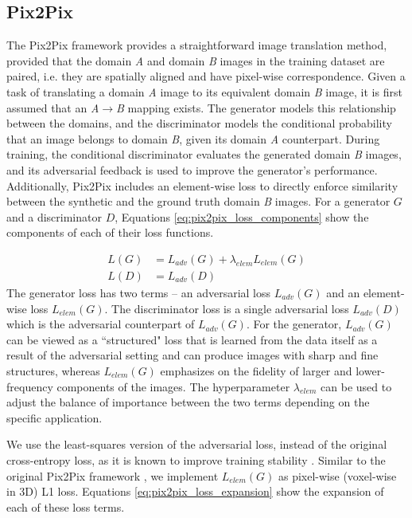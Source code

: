 \subsection{Pix2Pix}
\label{pix2pix}
The Pix2Pix framework provides a straightforward image translation method, provided that the domain \textit{A} and domain \textit{B} images in the training dataset are paired, i.e. they are spatially aligned and have pixel-wise correspondence. Given a task of translating a domain \textit{A} image to its equivalent domain \textit{B} image, it is first assumed that an \textit{A}$\rightarrow$\textit{B} mapping exists. The generator models this relationship between the domains, and the discriminator models the conditional probability that an image belongs to domain \textit{B}, given its domain \textit{A} counterpart. During training, the conditional discriminator evaluates the generated domain \textit{B} images, and its adversarial feedback is used to improve the generator's performance. Additionally, Pix2Pix includes an element-wise loss to directly enforce similarity between the synthetic and the ground truth domain \textit{B} images. For a generator $G$ and a discriminator $D$, Equations \ref{eq:pix2pix_loss_components} show the components of each of their loss functions. 

\begin{equation}
    \begin{aligned}
    L(G) &= L_{adv}(G) + \lambda_{elem} L_{elem}(G) \\
    L(D) &= L_{adv}(D)
    \end{aligned}
    \label{eq:pix2pix_loss_components}
\end{equation}
The generator loss has two terms -- an adversarial loss $L_{adv}(G)$ and an element-wise loss $L_{elem}(G)$. The discriminator loss is a single adversarial loss $L_{adv}(D)$ which is the adversarial counterpart of $L_{adv}(G)$. For the generator, $L_{adv}(G)$ can be viewed as a ``structured" loss that is learned from the data itself as a result of the adversarial setting and can produce images with sharp and fine structures, whereas $L_{elem}(G)$ emphasizes on the fidelity of larger and lower-frequency components of the images. The hyperparameter $\lambda_{elem}$ can be used to adjust the balance of importance between the two terms depending on the specific application.

We use the least-squares version of the adversarial loss, instead of the original cross-entropy loss, as it is known to improve training stability \cite{mao2017least}. Similar to the original Pix2Pix framework \cite{isola2017image}, we implement $L_{elem}(G)$ as pixel-wise (voxel-wise in 3D) L1 loss. Equations \ref{eq:pix2pix_loss_expansion} show the expansion of each of these loss terms.

